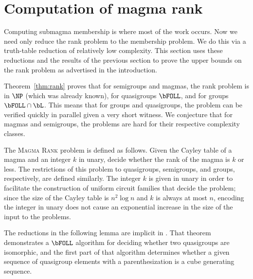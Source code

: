 \section{Computation of magma rank}\label{sec:rank}

%
Computing submagma membership is where most of the work occurs.
Now we need only reduce the rank problem to the membership problem.
We do this via a truth-table reduction of relatively low complexity.
This section uses these reductions and the results of the previous section to prove the upper bounds on the rank problem as advertised in the introduction.

%
Theorem~\ref{thm:rank} proves that for semigroups and magmas, the rank problem is in $\NP$ (which was already known), for quasigroups $\bFOLL$, and for groups $\bFOLL \cap \bL$.
This means that for groups and quasigroups, the problem can be verified quickly in parallel given a very short witness.
We conjecture that for magmas and semigroups, the problems are hard for their respective complexity classes.

The \textsc{Magma Rank} problem is defined as follows.
Given the Cayley table of a magma and an integer $k$ in unary, decide whether the rank of the magma is $k$ or less.
The restrictions of this problem to quasigroups, semigroups, and groups, respectively, are defined similarly.
The integer $k$ is given in unary in order to facilitate the construction of uniform circuit families that decide the problem; since the size of the Cayley table is $n^2 \log n$ and $k$ is always at most $n$, encoding the integer in unary does not cause an exponential increase in the size of the input to the problems.

The reductions in the following lemma are implicit in \autocite[Theorem~3.4]{ctw13}.
That theorem demonstrates a $\bFOLL$ algorithm for deciding whether two quasigroups are isomorphic, and the first part of that algorithm determines whether a given sequence of quasigroup elements with a parenthesization is a cube generating sequence.

